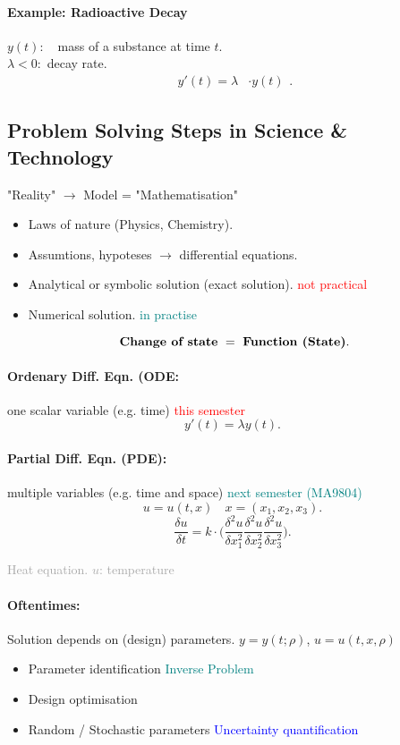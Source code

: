 \documentclass[]{article}
\begin{document}
	\paragraph{Example: Radioactive Decay}
	$~$\\$y(t):~~~$ mass of a substance at time $t$.\\
	$\lambda<0:$ decay rate.
	\[
	\begin{split}
	y'(t)=  \lambda &\cdot y(t)
	\end{split} 
	.\]
\subsection{Problem Solving Steps in Science \& Technology}
	"Reality" $ \longrightarrow $ Model = "Mathematisation"
	\begin{itemize}
		\item Laws of nature (Physics, Chemistry).
		\item Assumtions, hypoteses $ \rightarrow $ differential equations.
		\item Analytical or symbolic solution (exact solution). \textcolor{red}{not practical} 
		\item Numerical solution. \textcolor{teal}{in practise}
	\end{itemize}
	\[
		\text{ \textbf{Change of state}  }= \text{ \textbf{Function (State)}}
	.\]
	\paragraph{Ordenary Diff. Eqn. (ODE:} one scalar variable (e.g. time) \textcolor{red}{this semester}
	\[
	y'(t)=\lambda y(t)
	.\]
	\paragraph{Partial Diff. Eqn. (PDE):} multiple variables (e.g. time and space) \textcolor{teal}{next semester (MA9804)}
	\[
		u=u(t,x)\,\,\,~~x=(x_1,x_2,x_3) 
	.\]
	\[
		\frac{\delta u}{\delta t}=k \cdot \big( \frac{\delta ^{2}u}{\delta x_1 ^{2}}\frac{\delta ^{2}u}{\delta x_2 ^{2}}\frac{\delta ^{2}u}{\delta x_3 ^{2}}\big)
	.\]
	\begin{center}
		\textcolor{darkgray}{Heat equation. $u$: temperature}
	\end{center}

	\paragraph{Oftentimes:} Solution depends on (design) parameters. $y=y(t;\rho)$, $u=u(t,x,\rho)$
	\begin{itemize}
		\item Parameter identification \textcolor{teal}{Inverse Problem}
		\item Design optimisation
		\item Random / Stochastic parameters \textcolor{blue}{Uncertainty quantification}
	\end{itemize}
\end{document}
